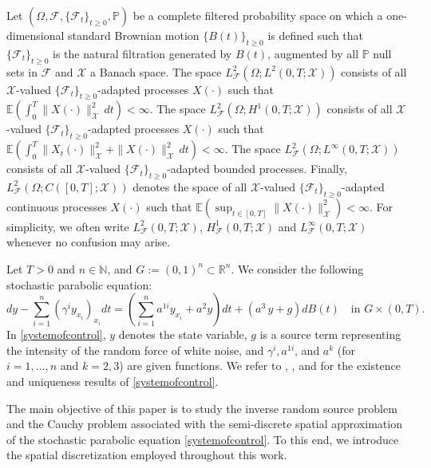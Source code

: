 \documentclass[11pt,oneside,leqno]{amsart}
\numberwithin{equation}{section}
\numberwithin{equation}{section}
\newcommand{\E}{\mathbb{E}}
\begin{document}
Let $(\Omega,\mathcal{F},\{\mathcal{F}_{t}\}_{t\geq 0},\mathbb{P})$ be a complete filtered probability space on which a one-dimensional standard Brownian motion $\{B(t)\}_{t\geq 0}$ is defined such that $\{\mathcal{F}_t\}_{t\geq0}$ is the natural filtration generated by $B(t)$, augmented by all $\mathbb{P}$ null sets in $\mathcal{F}$ and $\mathcal{X}$ a Banach space. The space $L^2_{\mathcal{F}}(\Omega;L^2(0,T;\mathcal{X}))$ consists of all $\mathcal{X}$-valued $\{\mathcal{F}_t\}_{t\geq 0}$-adapted processes $X(\cdot)$ such that 
$
\E\left(\int_0^T\|X(\cdot)\|^2_{\mathcal{X}}\,dt\right)<\infty.
$ {  The space $L^2_{\mathcal{F}}(\Omega;H^1(0,T;\mathcal{X}))$ consists of all $\mathcal{X}$-valued $\{\mathcal{F}_t\}_{t\geq 0}$-adapted processes $X(\cdot)$ such that 
$
\E\left(\int_0^T\|X_t(\cdot)\|^2_{\mathcal{X}}+\|X(\cdot)\|^2_{\mathcal{X}}\,dt\right)<\infty.
$ } 
The space $L^2_{\mathcal{F}}(\Omega;L^\infty(0,T;\mathcal{X}))$ consists of all $\mathcal{X}$-valued $\{\mathcal{F}_{t}\}_{t\geq 0}$-adapted bounded processes. Finally, $L^2_{\mathcal{F}}(\Omega;C([0,T];\mathcal{X}))$ denotes the space of all { $\mathcal{X}$}-valued $\{\mathcal{F}_{t}\}_{t\geq 0}$-adapted continuous processes $X(\cdot)$ such that 
$
\E\left(\sup_{t\in[0,T]}\|X(\cdot)\|^2_{\mathcal{X}}\right)<\infty.
$ 
For simplicity, we often write $L^2_{\mathcal{F}}(0,T;\mathcal{X})$, {  $H^1_{\mathcal{F}}(0,T;\mathcal{X})$} and $L^\infty_{\mathcal{F}}(0,T;\mathcal{X})$ whenever no confusion may arise.

Let $T>0$ and $n\in \mathds{N}$, and $G:=(0,1)^{n}\subset \mathbb{R}^n$. We consider the following stochastic parabolic equation: 
\begin{equation}\label{systemofcontrol}
dy-\sum_{i=1}^{n}(\gamma^{i} y_{x_i})_{x_i}dt =\left(\sum_{i=1}^{n}a^{1i}y_{x_i}+a^2y\right)dt+(a^3\,y+g)dB(t) \quad \text{in } G\times (0,T).
\end{equation}
In \eqref{systemofcontrol}, $y$ denotes the state variable, $g$ is a source term representing the intensity of the random force of white noise, and $\gamma^{i}, a^{1i}$, and $a^{k}$ (for $i=1,\ldots,n$ and $k=2,3$) are given functions. We refer to \cite{KR77}, \cite{Zho92}, and \cite{lu2021mathematical} for the existence and uniqueness results of \eqref{systemofcontrol}.

The main objective of this paper is to study the inverse random source problem and the Cauchy problem associated with the semi-discrete spatial approximation of the stochastic parabolic equation \eqref{systemofcontrol}. To this end, we introduce the spatial discretization employed throughout this work. 
\end{document}
